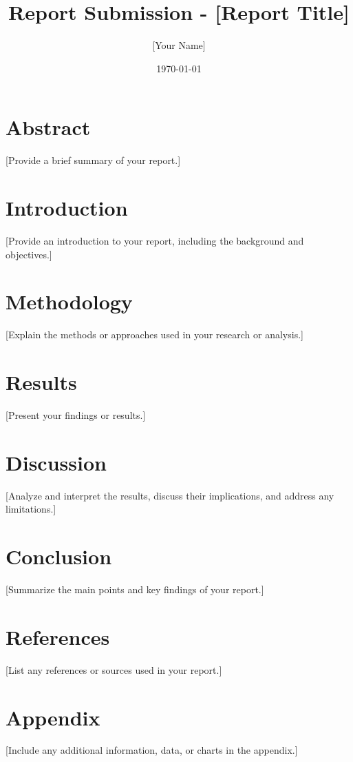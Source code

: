 \documentclass{article}
\begin{document}
\title{Report Submission - [Report Title]}
\author{[Your Name]}
\date{\today}

\maketitle

\section{Abstract}

[Provide a brief summary of your report.]

\section{Introduction}

[Provide an introduction to your report, including the background and objectives.]

\section{Methodology}

[Explain the methods or approaches used in your research or analysis.]

\section{Results}

[Present your findings or results.]

\section{Discussion}

[Analyze and interpret the results, discuss their implications, and address any limitations.]

\section{Conclusion}

[Summarize the main points and key findings of your report.]

\section{References}

[List any references or sources used in your report.]

\section{Appendix}

[Include any additional information, data, or charts in the appendix.]
\end{document}
